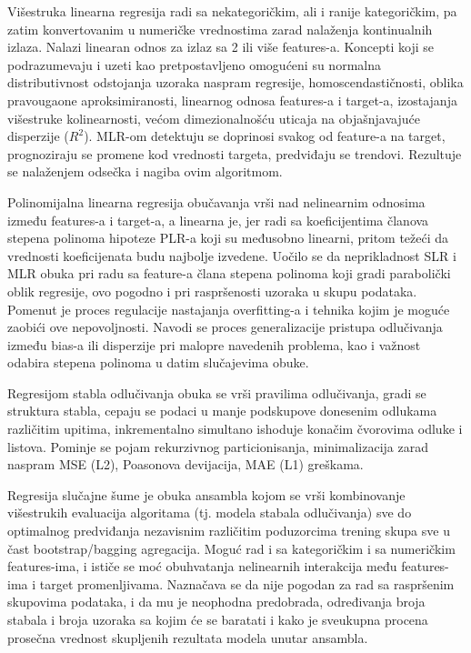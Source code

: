 \documentclass[fontsize=12bp, paper=a4]{scrarticle}
\begin{document}
\vbox{}

Višestruka linearna regresija radi sa nekategoričkim, ali i ranije kategoričkim, pa zatim konvertovanim u numeričke vrednostima zarad nalaženja kontinualnih izlaza. Nalazi linearan odnos za izlaz sa 2 ili više features-a. Koncepti koji se podrazumevaju i uzeti kao pretpostavljeno omogućeni su normalna distributivnost odstojanja uzoraka naspram regresije, homoscendastičnosti, oblika pravougaone aproksimiranosti, linearnog odnosa features-a i target-a, izostajanja višestruke kolinearnosti, većom dimezionalnošću uticaja na objašnjavajuće disperzije ($R^2$). MLR-om detektuju se doprinosi svakog od feature-a na target, prognoziraju se promene kod vrednosti targeta, predviđaju se trendovi. Rezultuje se nalaženjem odsečka i nagiba ovim algoritmom. 

\vbox{}

Polinomijalna linearna regresija obučavanja vrši nad nelinearnim odnosima između features-a i target-a, a linearna je, jer radi sa koeficijentima članova stepena polinoma hipoteze PLR-a koji su međusobno linearni, pritom težeći da vrednosti koeficijenata budu najbolje izvedene. Uočilo se da neprikladnost SLR i MLR obuka pri radu sa feature-a člana stepena polinoma koji gradi parabolički oblik regresije, ovo pogodno i pri raspršenosti uzoraka u skupu podataka. Pomenut je proces regulacije nastajanja overfitting-a i tehnika kojim je moguće zaobići ove nepovoljnosti. Navodi se proces generalizacije pristupa odlučivanja između bias-a ili disperzije pri malopre navedenih problema, kao i važnost odabira stepena polinoma u datim slučajevima obuke.

\vbox{}

Regresijom stabla odlučivanja obuka se vrši pravilima odlučivanja, gradi se struktura stabla, cepaju se podaci u manje podskupove donesenim odlukama različitim upitima, inkrementalno simultano ishoduje konačim čvorovima odluke i listova. Pominje se pojam rekurzivnog particionisanja, minimalizacija zarad naspram MSE (L2), Poasonova devijacija, MAE (L1) greškama.

\vbox{}

Regresija slučajne šume je obuka ansambla kojom se vrši kombinovanje višestrukih evaluacija algoritama (tj. modela stabala odlučivanja) sve do optimalnog predviđanja nezavisnim različitim poduzorcima trening skupa sve u čast bootstrap/bagging agregacija. Moguć rad i sa kategoričkim i sa numeričkim features-ima, i ističe se moć obuhvatanja nelinearnih interakcija među features-ima i target promenljivama. Naznačava se da nije pogodan za rad sa raspršenim skupovima podataka, i da mu je neophodna predobrada, određivanja broja stabala i broja uzoraka sa kojim će se baratati i kako je sveukupna procena prosečna vrednost skupljenih rezultata modela unutar ansambla.
\end{document}
